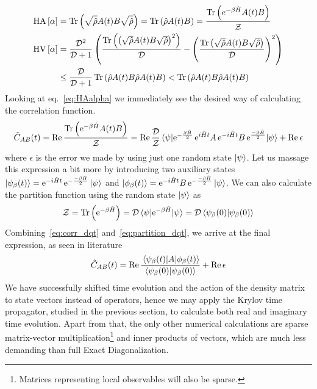 \begin{align}
	\mathrm{HA}\left[\alpha\right] & = \Tr\left(\sqrt{\hat{\rho}}A(t)B\sqrt{\hat{\rho}}\right) = \Tr\left(\hat{\rho}A(t)B\right) = \frac{\Tr\left(e^{-\beta \hat{H} }A(t)B\right)}{\mathcal{Z}} \label{eq:HAalpha} \\
	\mathrm{HV}\left[\alpha\right] & = \frac{\mathcal{D}^2}{\mathcal{D} + 1}\left(
	\frac{\Tr\left(\left(\sqrt{\hat{\rho}}A(t)B\sqrt{\hat{\rho}}\right)^2\right)}{\mathcal{D}} - \left(\frac{\Tr\left(\sqrt{\hat{\rho}}A(t)B\sqrt{\hat{\rho}}\right)}{\mathcal{D}}\right)^2
	\right) \nonumber                                                                                                                                                                                       \\
	                               & \leq \frac{\mathcal{D}}{\mathcal{D}+1} \Tr\left(\hat{\rho}A(t)B \hat{\rho}A(t)B\right) < \Tr\left(\hat{\rho}A(t)B \hat{\rho}A(t)B\right)
	\label{eq:HValpha}
\end{align}
Looking at eq.~\eqref{eq:HAalpha} we immediately see the desired way of calculating the correlation function.
\begin{equation}
	\tilde{C}_{AB}(t) = \Re \frac{\Tr\left(\mathrm{e}^{-\beta \hat{H} }A(t)B\right)}{\mathcal{Z}} = \Re \frac{\dimension}{\mathcal{Z}}
	\matrixel{\psi}{\mathrm{e}^{-\frac{\beta \hat{H} }{2}}\,\mathrm{e}^{i \hat{H}  t}A \,\mathrm{e}^{-i \hat{H}  t} B\,\mathrm{e}^{\frac{-\beta \hat{H} }{2}}}{\psi} + \Re \epsilon
	\label{eq:corr_dqt}
\end{equation}
where \(\epsilon\) is the error we made by using just one random state \(\ket{\psi}\).
Let us massage this expression a bit more by introducing two auxiliary states
\(\ket{\psi_{\beta}(t)} = \mathrm{e}^{-i \hat{H} t }\, \mathrm{e}^{-\frac{-\beta \hat{H} }{2}} \ket{\psi} \) and
\(\ket{\phi_{\beta}(t)} = \mathrm{e}^{-i \hat{H} t } B \,\mathrm{e}^{-\frac{-\beta \hat{H} }{2}} \ket{\psi} \). We can also
calculate the partition function using the random state \(\ket{\psi}\) as
\begin{equation}
	\mathcal{Z} = \Tr\left(\mathrm{e}^{-\beta \hat{H} }\right) = \dimension \matrixel{\psi}{\mathrm{e}^{-\beta \hat{H} }}{\psi} =
	\dimension \braket{\psi_{\beta}(0)}{\psi_{\beta}(0)}
	\label{eq:partition_dqt}
\end{equation}
Combining~\eqref{eq:corr_dqt} and~\eqref{eq:partition_dqt}, we arrive at the final expression, as seen in literature~\autocite{Steinigeweg2014,Steinigeweg2015,Richter2019}
\begin{equation}
	\tilde{C}_{AB}(t) = \Re \frac{\matrixel{\psi_{\beta}(t)}{A}{\phi_{\beta}(t)}}{\braket{\psi_{\beta}(0)}{\psi_{\beta}(0)}} + \Re \epsilon
	\label{eq:corr_dqt_final}
\end{equation}
We have successfully shifted time evolution and the action of the density matrix to state vectors instead of operators,
hence we may apply the Krylov time propagator, studied in the previous section, to calculate both real and imaginary time
evolution. Apart from that, the only other numerical calculations are sparse matrix-vector multiplication\footnote{Matrices representing local observables will also be sparse.}
and inner products of vectors, which are much less demanding than full Exact Diagonalization.

